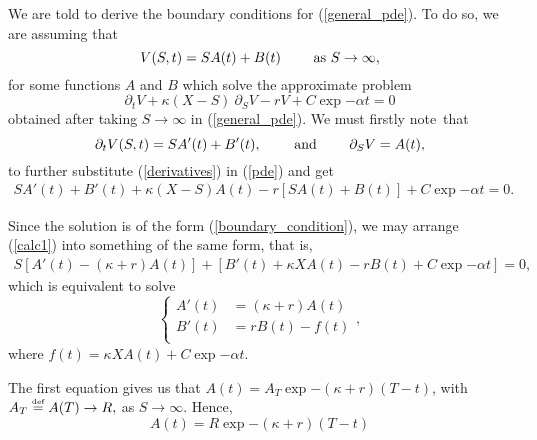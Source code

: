 \noindent We are told to derive the boundary conditions for (\ref{general_pde}). To do so, we are assuming that 
	\begin{equation}\label{boundary_condition}
		V(S, t) = S A(t) + B(t) \quad\quad \text{ as } S\to \infty,
	\end{equation}
for some functions $A$ and $B$ which solve the approximate problem
	\begin{equation}\label{pde}
		\partial_t V + \kappa (X - S) \ \partial_S V - rV + C \exp{-\alpha t} = 0
	\end{equation}
obtained after taking $S\to\infty$ in (\ref{general_pde}). We must firstly note~that
	\begin{equation}\label{derivatives}
		\partial_t V (S, t) = S A'(t) + B'(t), \quad\quad \text{ and } \quad\quad \partial_S V = A(t),
	\end{equation}
to further substitute (\ref{derivatives}) in (\ref{pde}) and get
	\begin{equation}\label{calc1}
		\begin{aligned}
			S A'(t) + B'(t) + \kappa (X - S) A(t) - r \left[ S A(t) + B(t)\right] + C\exp{-\alpha t} = 0.
		\end{aligned}
	\end{equation}

Since the solution is of the form (\ref{boundary_condition}), we may arrange (\ref{calc1}) into something of the same form, that is,
	\begin{equation}\label{calc2}
		\begin{aligned}
			S \left[A'(t) - (\kappa + r) A(t) \right] + \left[ B'(t) + \kappa X A(t) - rB(t) + C\exp{-\alpha t}\right] = 0,
		\end{aligned}
	\end{equation}
which is equivalent to solve
	\begin{equation}
		\begin{cases}
			A'(t) &=  (\kappa + r) A(t) \\
			B'(t) &= rB(t)  - f(t) \\
		\end{cases},
	\end{equation}
where $f(t) = \kappa X A(t) + C\exp{-\alpha t}$.

The first equation gives us that $A(t) = A_T \exp{-(\kappa + r)(T-t)}$, with 
$
A_T \overset{\text{\tiny def}}{=} A(T) \to R,
$ 
as $S\to\infty$. Hence, 
\begin{equation}
	A(t) = R\exp{-(\kappa + r)(T-t)}
\end{equation} 

